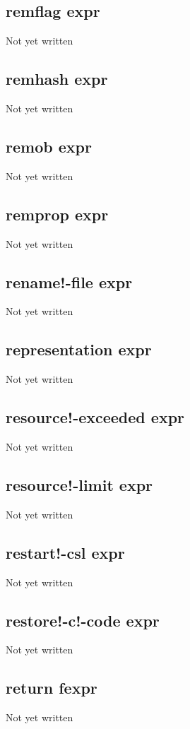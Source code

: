 \documentclass[a4paper,11pt]{article}
\begin{document}
\subsection{\ttfamily remflag expr}
Not yet written

\subsection{\ttfamily remhash expr}
Not yet written

\subsection{\ttfamily remob expr}
Not yet written

\subsection{\ttfamily remprop expr}
Not yet written

\subsection{\ttfamily rename!-file expr}
Not yet written

\subsection{\ttfamily representation expr}
Not yet written

\subsection{\ttfamily resource!-exceeded expr}
Not yet written

\subsection{\ttfamily resource!-limit expr}
Not yet written

\subsection{\ttfamily restart!-csl expr}
Not yet written

\subsection{\ttfamily restore!-c!-code expr}
Not yet written

\subsection{\ttfamily return fexpr}
Not yet written
\end{document}
